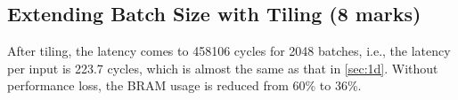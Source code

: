 \subsection{Extending Batch Size with Tiling (8 marks)}\label{sec:1e}

After tiling, the latency comes to 458106 cycles for 2048 batches, i.e., the latency per input is 223.7 cycles, which is almost the same as that in \autoref{sec:1d}.
Without performance loss, the BRAM usage is reduced from 60\% to 36\%.

